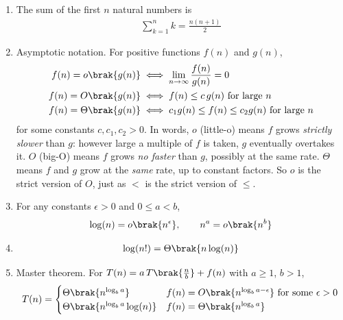 \begin{enumerate}[label=\thesubsection.\arabic*, ref=\thesubsection.\theenumi]
\item The sum of the first $n$ natural numbers is
\begin{align}
\sum_{k=1}^{n} k = \frac{n(n+1)}{2}
\label{eq:arith-sum}
\end{align}

\item Asymptotic notation. For positive functions $f(n)$ and $g(n)$,
\begin{align}
f(n) = o\brak{g(n)} &\iff \lim_{n \to \infty} \frac{f(n)}{g(n)} = 0
\label{eq:little-o} \\
f(n) = O\brak{g(n)} &\iff f(n) \le c\, g(n) \text{ for large } n
\label{eq:big-o} \\
f(n) = \Theta\brak{g(n)} &\iff c_1 g(n) \le f(n) \le c_2 g(n)
\text{ for large } n
\label{eq:theta}
\end{align}
for some constants $c, c_1, c_2 > 0$. In words, $o$ (little-o) means $f$ grows \emph{strictly slower} than $g$:
however large a multiple of $f$ is taken, $g$ eventually overtakes it.
$O$ (big-O) means $f$ grows \emph{no faster} than $g$, possibly at the
same rate. $\Theta$ means $f$ and $g$ grow at the \emph{same} rate, up to
constant factors. So $o$ is the strict version of $O$, just as $<$ is the
strict version of $\le$.

\item For any constants $\epsilon > 0$ and $0 \le a < b$,
\begin{align}
\log(n) = o\brak{n^{\epsilon}}, \qquad n^{a} = o\brak{n^{b}}
\label{eq:growth}
\end{align}

\item
\begin{align}
\log(n!) = \Theta\brak{n \log(n)}
\label{eq:log-fact}
\end{align}

\item Master theorem. For $T(n) = a\,T\brak{\frac{n}{b}} + f(n)$ with
$a \ge 1$, $b > 1$,
\begin{align}
T(n) =
\begin{cases}
\Theta\brak{n^{\log_b a}} & f(n) = O\brak{n^{\log_b a - \epsilon}}
\text{ for some } \epsilon > 0 \\
\Theta\brak{n^{\log_b a}\log(n)} & f(n) = \Theta\brak{n^{\log_b a}}
\end{cases}
\label{eq:master}
\end{align}


\end{enumerate}

